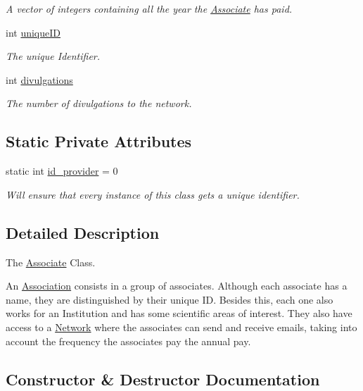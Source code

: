 \begin{DoxyCompactItemize}
\begin{DoxyCompactList}\small\item\em A vector of integers containing all the year the \hyperlink{classAssociate}{Associate} has paid. \end{DoxyCompactList}\item 
int \hyperlink{classAssociate_a55a1f311ac7cb8020e9631f283cb74e6}{unique\+ID}
\begin{DoxyCompactList}\small\item\em The unique Identifier. \end{DoxyCompactList}\item 
int \hyperlink{classAssociate_a5f697e757ce7e1be1ed4a2421679b804}{divulgations}
\begin{DoxyCompactList}\small\item\em The number of divulgations to the network. \end{DoxyCompactList}\end{DoxyCompactItemize}
\subsection*{Static Private Attributes}
\begin{DoxyCompactItemize}
\item 
static int \hyperlink{classAssociate_a9fcd0a229b70369a3f6beaf7a02fe58f}{id\+\_\+provider} = 0
\begin{DoxyCompactList}\small\item\em Will ensure that every instance of this class gets a unique identifier. \end{DoxyCompactList}\end{DoxyCompactItemize}


\subsection{Detailed Description}
The \hyperlink{classAssociate}{Associate} Class. 

An \hyperlink{classAssociation}{Association} consists in a group of associates. Although each associate has a name, they are distinguished by their unique ID. Besides this, each one also works for an Institution and has some scientific areas of interest. They also have access to a \hyperlink{classNetwork}{Network} where the associates can send and receive emails, taking into account the frequency the associates pay the annual pay. 

\subsection{Constructor \& Destructor Documentation}
\mbox{\label{classAssociate_a624e687ad91b6311e7e493adab0a9adc}} 
